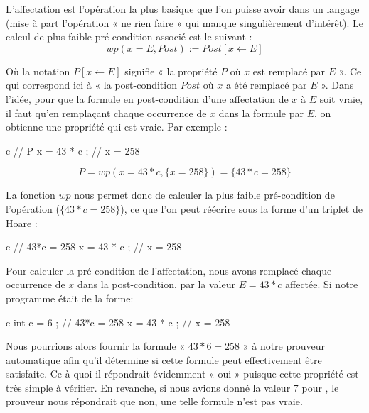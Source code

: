 

L'affectation est l'opération la plus basique que l'on puisse avoir dans un 
langage (mise à part l'opération « ne rien faire » qui manque singulièrement 
d'intérêt). Le calcul de plus faible pré-condition associé est le suivant :
$$wp(x = E , Post) := Post[x \leftarrow E]$$


Où la notation $P[x \leftarrow E]$ signifie « la propriété $P$ où $x$ est remplacé
par $E$ ». Ce qui correspond ici à « la post-condition $Post$ où $x$ a été
remplacé par $E$ ». Dans l'idée, pour que la formule en post-condition d'une 
affectation de $x$ à $E$ soit vraie, il faut qu'en remplaçant chaque occurrence de
$x$ dans la formule par $E$, on obtienne une propriété qui est vraie. Par exemple :



\begin{CodeBlock}{c}
// { P }
x = 43 * c ;
// { x = 258 }
\end{CodeBlock}

$$P = wp(x = 43*c , \{x = 258\}) = \{43*c = 258\}$$


La fonction $wp$ nous permet donc de calculer la plus faible pré-condition de
l'opération ($\{43*c = 258\}$), ce que l'on peut réécrire sous la forme d'un
triplet de Hoare :



\begin{CodeBlock}{c}
// { 43*c = 258 }
x = 43 * c ;
// { x = 258 }
\end{CodeBlock}



Pour calculer la pré-condition de l'affectation, nous avons remplacé chaque 
occurrence de $x$ dans la post-condition, par la valeur $E = 43*c$ affectée.
Si notre programme était de la forme:



\begin{CodeBlock}{c}
int c = 6 ;
// { 43*c = 258 }
x = 43 * c ;
// { x = 258 }
\end{CodeBlock}



Nous pourrions alors fournir la formule « $43*6 = 258$ » à notre prouveur automatique
afin qu'il détermine si cette formule peut effectivement être satisfaite. Ce à quoi
il répondrait évidemment « oui » puisque cette propriété est très simple à vérifier.
En revanche, si nous avions donné la valeur 7 pour , le prouveur nous répondrait
que non, une telle formule n'est pas vraie.



